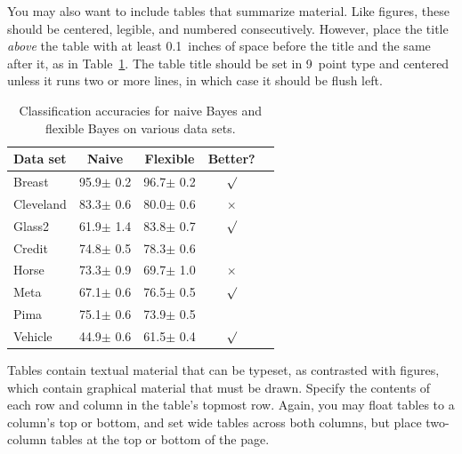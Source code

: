 \documentclass{article}
\begin{document}
You may also want to include tables that summarize material. Like 
figures, these should be centered, legible, and numbered consecutively. 
However, place the title {\it above\/} the table with at least 
0.1~inches of space before the title and the same after it, as in 
Table~\ref{sample-table}. The table title should be set in 9~point 
type and centered unless it runs two or more lines, in which case it
should be flush left.


\begin{table}[t]
\caption{Classification accuracies for naive Bayes and flexible 
Bayes on various data sets.}
\label{sample-table}
\vskip 0.15in
\begin{center}
\begin{small}
\begin{sc}
\begin{tabular}{lcccr}
\hline
\abovespace\belowspace
Data set & Naive & Flexible & Better? \\
\hline
\abovespace
Breast    & 95.9$\pm$ 0.2& 96.7$\pm$ 0.2& $\surd$ \\
Cleveland & 83.3$\pm$ 0.6& 80.0$\pm$ 0.6& $\times$\\
Glass2    & 61.9$\pm$ 1.4& 83.8$\pm$ 0.7& $\surd$ \\
Credit    & 74.8$\pm$ 0.5& 78.3$\pm$ 0.6&         \\
Horse     & 73.3$\pm$ 0.9& 69.7$\pm$ 1.0& $\times$\\
Meta      & 67.1$\pm$ 0.6& 76.5$\pm$ 0.5& $\surd$ \\
Pima      & 75.1$\pm$ 0.6& 73.9$\pm$ 0.5&         \\
\belowspace
Vehicle   & 44.9$\pm$ 0.6& 61.5$\pm$ 0.4& $\surd$ \\
\hline
\end{tabular}
\end{sc}
\end{small}
\end{center}
\vskip -0.1in
\end{table}

Tables contain textual material that can be typeset, as contrasted 
with figures, which contain graphical material that must be drawn. 
Specify the contents of each row and column in the table's topmost
row. Again, you may float tables to a column's top or bottom, and set
wide tables across both columns, but place two-column tables at the
top or bottom of the page.
 
\end{document}
